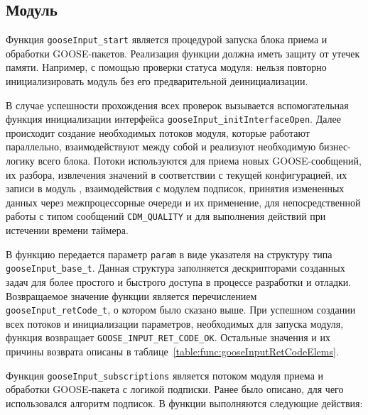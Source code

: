 \subsection{Модуль \moduleThreads}

Функция \lstinline{gooseInput_start} является процедурой запуска блока приема и
обработки GOOSE-пакетов. Реализация функции должна иметь защиту от
утечек памяти. Например, с помощью проверки статуса модуля:
нельзя повторно инициализировать модуль без его предварительной деинициализации.

В случае успешности прохождения всех проверок вызывается вспомогательная
функция инициализации
интерфейса \lstinline{gooseInput_initInterfaceOpen}. Далее происходит создание
необходимых потоков модуля, которые работают параллельно, взаимодействуют между собой и реализуют необходимую бизнес-логику всего блока.
Потоки используются
для приема новых GOOSE-сообщений, их разбора, извлечения значений в соответствии с текущей конфигурацией, их записи в модуль \moduleDataStoring,
взаимодействия с модулем подписок, принятия измененных данных через межпроцессорные очереди и их применение, для непосредственной
работы с типом сообщений \lstinline{CDM_QUALITY} и для выполнения действий при истечении времени таймера.

В функцию передается параметр \lstinline{param} в виде указателя на структуру типа \lstinline{gooseInput_base_t}.
Данная структура заполняется дескрипторами созданных задач для более простого и быстрого доступа в процессе разработки и отладки.
Возвращаемое значение функции является перечислением
\lstinline{gooseInput_retCode_t}, о котором было сказано выше. При успешном создании всех потоков и инициализации параметров, необходимых для запуска модуля, функция возвращает \lstinline{GOOSE_INPUT_RET_CODE_OK}. Остальные значения и их
причины возврата описаны в таблице~\ref{table:func:gooseInputRetCodeElems}.

Функция \lstinline{gooseInput_subscriptions} является потоком модуля приема и обработки GOOSE-пакета с логикой подписки. Ранее было описано, для чего использовался алгоритм подписок. В функции выполняются следующие действия:


